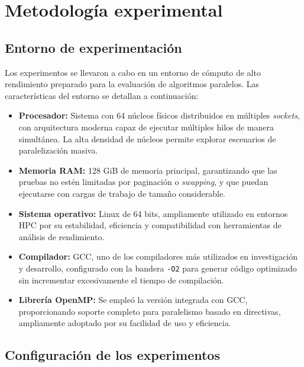 \section{Metodología experimental}

    \subsection{Entorno de experimentación}
    
        Los experimentos se llevaron a cabo en un entorno de cómputo de alto rendimiento preparado para la evaluación de algoritmos paralelos. Las características del entorno se detallan a continuación:
        
        \begin{itemize}
        
            \item \textbf{Procesador:} Sistema con 64 núcleos físicos distribuidos en múltiples \textit{sockets}, con arquitectura moderna capaz de ejecutar múltiples hilos de manera simultánea. La alta densidad de núcleos permite explorar escenarios de paralelización masiva.
            
            \item \textbf{Memoria RAM:} 128 GiB de memoria principal, garantizando que las pruebas no estén limitadas por paginación o \textit{swapping}, y que puedan ejecutarse con cargas de trabajo de tamaño considerable.
            
            \item \textbf{Sistema operativo:} Linux de 64 bits, ampliamente utilizado en entornos HPC por su estabilidad, eficiencia y compatibilidad con herramientas de análisis de rendimiento.
            
            \item \textbf{Compilador:} GCC, uno de los compiladores más utilizados en investigación y desarrollo, configurado con la bandera \texttt{-O2} para generar código optimizado sin incrementar excesivamente el tiempo de compilación.
            
            \item \textbf{Librería OpenMP:} Se empleó la versión integrada con GCC, proporcionando soporte completo para paralelismo basado en directivas, ampliamente adoptado por su facilidad de uso y eficiencia.
            
        \end{itemize}

    \subsection{Configuración de los experimentos}
    
